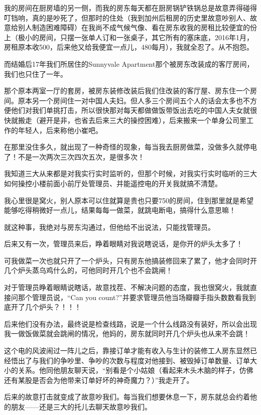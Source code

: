 \documentclass[9pt, b5paper]{article}
\begin{document}
我的房间在厨房墙的另一侧，而我的房东每天都在厨房锅铲铁锅总是故意弄得碰得叮铛响，真的是吵死了，但那时的住处（我到加州后租房的历史里故意吵别人、故意给别人制造困难障碍）在我尚不成气候气像、看在房东收我的房租比较便宜的份上（极小的房间，只摆一张单人订和一张桌子，其它所有的塞床底，2016年1月，房租原本收500，后来他又给我便宜一点儿，480每月），我就全忍了。从不抱怨。

而结婚后17年我们所居住的Sunnyvale Apartment那个被房东改装成的客厅房间，我们也只住了一年。

那个原本两室一厅的套房，被房东装修改装后我们住改装的客厅屋、房东住一个房间。原本另一个房间住一对中国人夫妇。但人多三个房间五个人的话会太多也不方便他们对我们单挑打击，所以很快那对每天都做做饭带饭出去吃的中国人夫女就很快就搬走（避开是非，也省去后来三大的操控困难），后来搬来一个单身公司里工作的年轻人，后来称他小崔吧。 

在那里没住多久，就出现了一种奇怪的现象，每当我去厨房做菜，没做多久就停电了！不是一次两次三次四次五次，是很多次！

我知道三大从来都是对我实行实时监听的，但那个时候，对我实行实时临听的三大如何操控小楼前面小前厅处管理员、并能遥控电的开关我就搞不清楚。

我心里很是窝火，别人原本可以住就算是贵也只要750的房间，住到那里就是希望能够吃得稍微好一点儿，结果每每一做菜，就跳电断电，搞得什么意思嘛！

就这种事，我绝对与房东沟通过，但他给不出说法，只能找管理员。

后来又有一次，管理员来后，睁着眼睛对我说瞎说话，是你开的炉头太多了！

可我做菜一次也就只开了一个炉头，只有房东他搞装修回来了累了，他才会同时开几个炉头蒸乌鸡什么的，可他同时开几个也不会跳闸！

对于管理员睁着眼睛说瞎话，故意找茬、不解决问题的态度，我也很窝火，我就直接问那个管理员说，“Can you count?”并要求管理员他当场瓣瓣手指头数数看我到底开了几个炉头？！！！

后来他们没有办法，最终说是检查线路，说是一个什么线路没有装好，所以会出现我一做饭做菜就会跳闸的情况，他妈的，房东就同时开几个炉头也从来不会跳！

这个电的风波闹过一阵儿之后，靠接订单才能有收入与生计的装修工人房东显然已经悟出了与我们的争吵里、争吵的次数与程度对他接到、被毁掉订单数量、订单大小的关系。他同他朋友聊天说，“别看是个小姑娘（看起来木头木脑的样子，仿佛还有某股是否会为他带来订单好坏的神奇魔力？）”我走开了。

后来的故意打击就变成了故意吵我们。每当我们想要休息一下，房东就总会约着他的朋友——还是三大的托儿去聊天故意吵我们。
\end{document}
